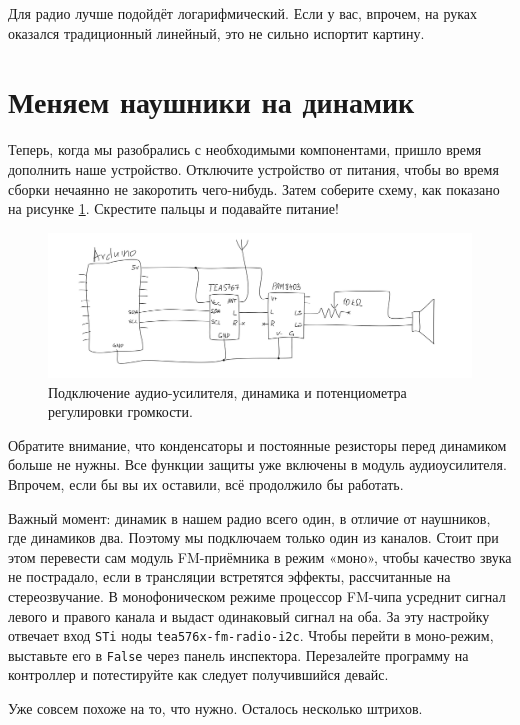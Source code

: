 Для радио лучше подойдёт логарифмический. Если у вас, впрочем, на руках оказался традиционный линейный, это не сильно испортит картину.

\section{Меняем наушники на динамик}

Теперь, когда мы разобрались с необходимыми компонентами, пришло время дополнить наше устройство. Отключите устройство от питания, чтобы во время сборки нечаянно не закоротить чего-нибудь. Затем соберите схему, как показано на рисунке \ref{fig:amp-pot-speaker-wiring}. Скрестите пальцы и подавайте питание!

\begin{figure}
  \centering
  \includegraphics{sketches/amp-pot-speaker-wiring}
  \caption{Подключение аудио-усилителя, динамика и потенциометра регулировки громкости.}
  \label{fig:amp-pot-speaker-wiring}
\end{figure}

Обратите внимание, что конденсаторы и постоянные резисторы перед динамиком больше не нужны. Все функции защиты уже включены в модуль аудиоусилителя. Впрочем, если бы вы их оставили, всё продолжило бы работать.

Важный момент: динамик в нашем радио всего один, в отличие от наушников, где динамиков два. Поэтому мы подключаем только один из каналов. Стоит при этом перевести сам модуль FM-приёмника в режим «моно», чтобы качество звука не пострадало, если в трансляции встретятся эффекты, рассчитанные на стереозвучание.
В монофоническом режиме процессор FM-чипа усреднит сигнал левого и правого канала и выдаст одинаковый сигнал на оба. За эту настройку отвечает вход \texttt{STi} ноды \texttt{tea576x-fm-radio-i2c}. Чтобы перейти в моно-режим, выставьте его в \texttt{False} через панель инспектора. Перезалейте программу на контроллер и потестируйте как следует получившийся девайс.

Уже совсем похоже на то, что нужно. Осталось несколько штрихов.

